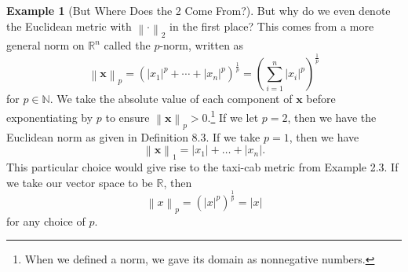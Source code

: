 \documentclass{article}
\newcommand{\N}{\mathbb{N}}
\newcommand{\R}{\mathbb{R}}
\newcommand{\x}{\mathbf{x}}
\newcommand{\norm}[1]{\left\lVert#1\right\rVert}
\theoremstyle{definition}
\newtheorem{example}{Example}[section]
\begin{document}
\begin{example}[But Where Does the 2 Come From?]
	But why do we even denote the Euclidean metric with $ \norm{\cdot}_2 $ in the first place? This comes from a more general norm on $ \R^n $ called the $ p $-norm, written as $$ \norm{\x}_p=(|x_1|^p+\cdots + |x_n|^p)^\frac{1}{p}=\left(\sum_{i=1}^n|x_i|^p\right)^\frac{1}{p}$$ for $ p\in\N $. We take the absolute value of each component of $ \x $ before exponentiating by $ p $ to ensure $ \norm{\x}_p>0 $.\footnote{When we defined a norm, we gave its domain as nonnegative numbers.} If we let $ p=2 $, then we have the Euclidean norm as given in Definition 8.3. If we take $ p=1 $, then we have $$ \norm{\x}_1=|x_1|+\ldots+|x_n|.$$ This particular choice would give rise to the taxi-cab metric from Example 2.3. If we take our vector space to be $ \R $, then $$\norm{x}_p=\left(|x|^p \right)^\frac{1}{p}=|x|$$ for any choice of $ p $.
	

\end{example}
\end{document}
